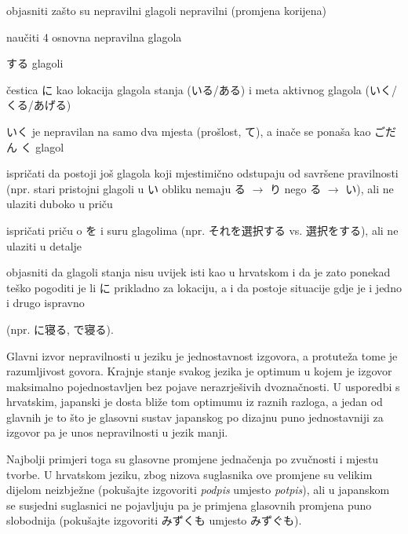 
\author{Tomislav Mamić}

	
	
	\begin{hyou}
		\item objasniti zašto su nepravilni glagoli nepravilni (promjena korijena)
		\item naučiti 4 osnovna nepravilna glagola
		\item する glagoli
		\item čestica に kao lokacija glagola stanja (いる/ある) i meta aktivnog glagola (いく/くる/あげる)
	\end{hyou}

	
	\begin{hyou}
		\item いく je nepravilan na samo dva mjesta (prošlost, て), a inače se ponaša kao ごだん く glagol
		\item ispričati da postoji još glagola koji mjestimično odstupaju od savršene pravilnosti (npr. stari pristojni glagoli u い obliku nemaju る $\rightarrow$ り nego る $\rightarrow$ い), ali ne ulaziti duboko u priču
		\item ispričati priču o を i suru glagolima (npr. それを選択する vs. 選択をする), ali ne ulaziti u detalje
		\item objasniti da glagoli stanja nisu uvijek isti kao u hrvatskom i da je zato ponekad teško pogoditi je li に prikladno za lokaciju, a i da postoje situacije gdje je i jedno i drugo ispravno
		
		(npr. に寝る, で寝る).
	\end{hyou}

	
	Glavni izvor nepravilnosti u jeziku je jednostavnost izgovora, a protuteža tome je razumljivost govora. Krajnje stanje svakog jezika je optimum u kojem je izgovor maksimalno pojednostavljen bez pojave nerazrješivih dvoznačnosti. U usporedbi s hrvatskim, japanski je dosta bliže tom optimumu iz raznih razloga, a jedan od glavnih je to što je glasovni sustav japanskog po dizajnu puno jednostavniji za izgovor pa je unos nepravilnosti u jezik manji.
	
	Najbolji primjeri toga su glasovne promjene jednačenja po zvučnosti i mjestu tvorbe. U hrvatskom jeziku, zbog nizova suglasnika ove promjene su velikim dijelom neizbježne (pokušajte izgovoriti \textit{podpis} umjesto \textit{potpis}), ali u japanskom se susjedni suglasnici ne pojavljuju pa je primjena glasovnih promjena puno slobodnija (pokušajte izgovoriti みずくも umjesto みずぐも).
	
